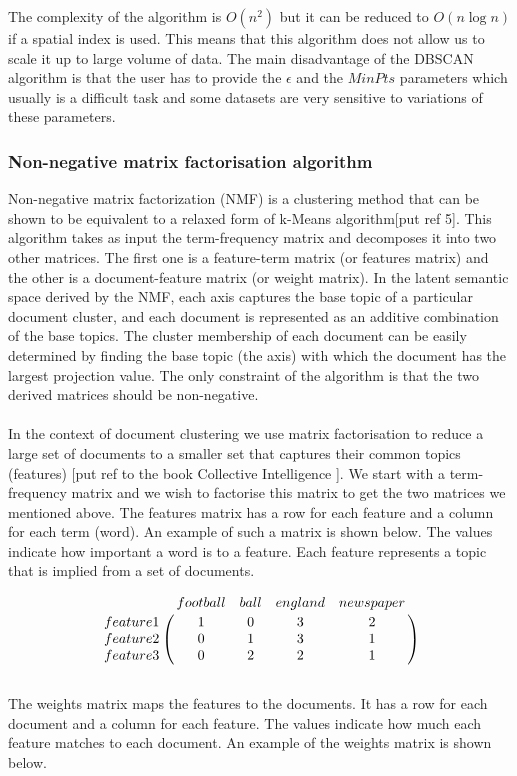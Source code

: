 The complexity of the algorithm is $O(n^2)$ but it can be reduced to $O(n\log n)$ if a spatial index is used. This means that this algorithm does not allow us to scale it up to large volume of data. The main disadvantage of the DBSCAN algorithm is that the user has to provide the $\epsilon $ and the $MinPts$ parameters which usually is a difficult task and some datasets are very sensitive to variations of these parameters. 

\subsubsection{Non-negative matrix factorisation algorithm}
Non-negative matrix factorization (NMF) is a clustering method that can be shown to be equivalent to a relaxed form of k-Means algorithm[put ref 5]. This algorithm takes as input the term-frequency matrix and decomposes it into two other matrices. The first one is a feature-term matrix (or features matrix) and the other is a document-feature matrix (or weight matrix). In the latent semantic space derived by the NMF, each axis captures the base topic of a particular document cluster, and each document is represented as an additive combination of the base topics. The cluster membership of each document can be easily determined by finding the base topic (the axis) with which the document has the largest projection value. The only constraint of the algorithm is that the two derived matrices should be non-negative.\\\\ 
In the context of document clustering we use matrix factorisation to reduce a large set of documents to a smaller set that captures their common topics (features) [put ref to the book Collective Intelligence ]. We start with a term-frequency matrix and we wish to factorise this matrix to get the two matrices we mentioned above. The features matrix has a row for each feature and a column for each term (word). An example of such a matrix is shown below. The values indicate how important a word is to a feature. Each feature represents a topic that is implied from a set of documents. 

\[
\bordermatrix{~ & football & ball & england & newspaper \cr
                  feature 1 & 1 & 0 & 3 & 2 \cr
                  feature 2 & 0 & 1 & 3 & 1\cr
                  feature 3 & 0 & 2 & 2 & 1\cr}
\]\\
The weights matrix maps the features to the documents. It has a row for each document and a column for each feature. The values indicate how much each feature matches to each document. An example of the weights matrix is shown below. 

